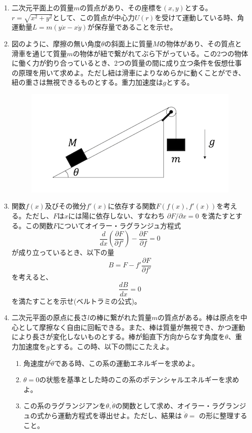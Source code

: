\documentclass{jsarticle}
\begin{document}
\begin{enumerate}
    \item 二次元平面上の質量$m$の質点があり、その座標を$(x,y)$とする。$r=\sqrt{x^2+y^2}$として、この質点が中心力$U(r)$を受けて運動している時、角運動量$L=m(y\dot{x} - x\dot{y})$が保存量であることを示せ。
    \item 図のように、摩擦の無い角度$\theta$の斜面上に質量$M$の物体があり、その質点と滑車を通じて質量$m$の物体が紐で繋がれてぶら下がっている。この2つの物体に働く力が釣り合っているとき、2つの質量の間に成り立つ条件を仮想仕事の原理を用いて求めよ。ただし紐は滑車によりなめらかに動くことができ、紐の重さは無視できるものとする。重力加速度は$g$とする。
          \begin{figure}[H]
              \centering
              \includegraphics{fig/slope.png}
          \end{figure}
    \item 関数$f(x)$及びその微分$f'(x)$に依存する関数$F(f(x), f'(x))$を考える。ただし、$F$は$x$には陽に依存しない、すなわち $\partial F/\partial x = 0$ を満たすとする。この関数$F$についてオイラー・ラグランジュ方程式
          $$
              \frac{d}{dx} \left(\frac{\partial F}{\partial f'} \right)
              - \frac{\partial F}{\partial f} = 0
          $$
          が成り立っているとき、以下の量
          $$
              B = F - f' \frac{\partial F}{\partial f'}
          $$
          を考えると、
          $$
              \frac{dB}{dx} = 0
          $$
          を満たすことを示せ(ベルトラミの公式)。

          \newpage

    \item 二次元平面の原点に長さ$l$の棒に繋がれた質量$m$の質点がある。棒は原点を中心として摩擦なく自由に回転できる。また、棒は質量が無視でき、かつ運動により長さが変化しないものとする。棒が鉛直下方向からなす角度を$\theta$、重力加速度を$g$とする。この時、以下の問にこたえよ。
          \begin{enumerate}

              \item 角速度が$\dot{\theta}$である時、この系の運動エネルギーを求めよ。
              \item $\theta=0$の状態を基準とした時のこの系のポテンシャルエネルギーを求めよ。
              \item この系のラグランジアンを$\theta, \dot{\theta}$の関数として求め、オイラー・ラグランジュの式から運動方程式を導出せよ。ただし、結果は $\ddot{\theta} = $ の形に整理すること。
          \end{enumerate}


\end{enumerate}
\end{document}
